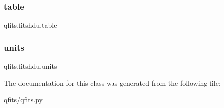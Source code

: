 \mbox{\label{classqfits_1_1fitshdu_ac4a3243bf29f297426e218093d4640ca}} 
\subsubsection{\texorpdfstring{table}{table}}
{\footnotesize\ttfamily qfits.\+fitshdu.\+table}

\mbox{\label{classqfits_1_1fitshdu_ab91f44f5ccbca3a45109ba487642a4c0}} 
\subsubsection{\texorpdfstring{units}{units}}
{\footnotesize\ttfamily qfits.\+fitshdu.\+units}



The documentation for this class was generated from the following file\+:\begin{DoxyCompactItemize}
\item 
qfits/\hyperlink{qfits_8py}{qfits.\+py}\end{DoxyCompactItemize}
